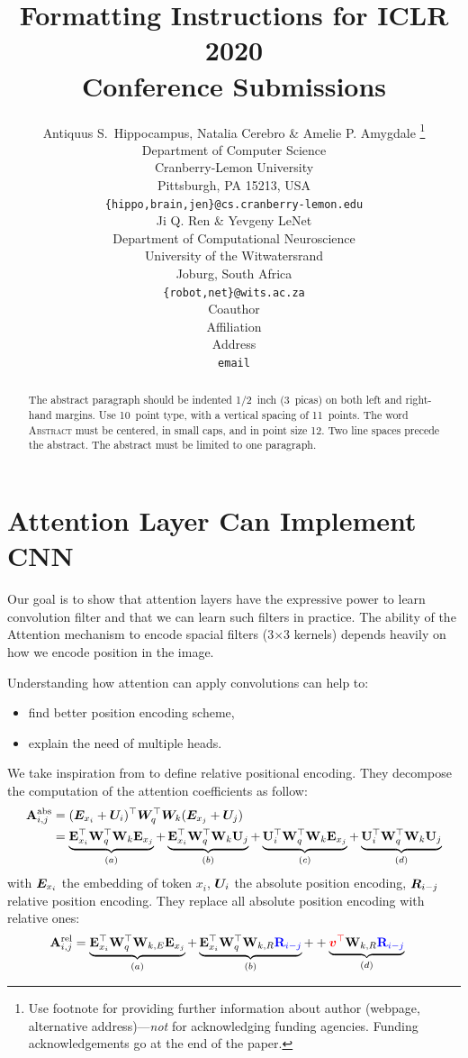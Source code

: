 \documentclass{article} %
\title{Formatting Instructions for ICLR 2020 \\ Conference Submissions}
\author{Antiquus S.~Hippocampus, Natalia Cerebro \& Amelie P. Amygdale \thanks{ Use footnote for providing further information
about author (webpage, alternative address)---\emph{not} for acknowledging
funding agencies.  Funding acknowledgements go at the end of the paper.} \\
Department of Computer Science\\
Cranberry-Lemon University\\
Pittsburgh, PA 15213, USA \\
\texttt{\{hippo,brain,jen\}@cs.cranberry-lemon.edu} \\
\And
Ji Q. Ren \& Yevgeny LeNet \\
Department of Computational Neuroscience \\
University of the Witwatersrand \\
Joburg, South Africa \\
\texttt{\{robot,net\}@wits.ac.za} \\
\AND
Coauthor \\
Affiliation \\
Address \\
\texttt{email}
}
\begin{document}
\maketitle

\begin{abstract}
The abstract paragraph should be indented 1/2~inch (3~picas) on both left and
right-hand margins. Use 10~point type, with a vertical spacing of 11~points.
The word \textsc{Abstract} must be centered, in small caps, and in point size 12. Two
line spaces precede the abstract. The abstract must be limited to one
paragraph.
\end{abstract}

\section{Attention Layer Can Implement CNN}

Our goal is to show that attention layers have the expressive power to learn 
convolution filter and that we can learn such filters in practice.
%
The ability of the Attention mechanism to encode spacial filters (3$\times$3 kernels) 
depends heavily on how we encode position in the image.


Understanding how attention can apply convolutions can help to:
\begin{itemize}
  \item find better position encoding scheme,
  \item explain the need of multiple heads.
\end{itemize}

We take inspiration from \citep[TransformerXL]{dai2019transformerxl} to define relative positional encoding.
They decompose the computation of the attention coefficients as follow:
\begin{align}
    \mathbf{A}_{i, j}^{\mathrm{abs}} &= ({\bm{E}}_{x_i} + {\bm{U}}_i)^\top {\bm{W}}_q^\top {\bm{W}}_k ({\bm{E}}_{x_j} + {\bm{U}}_j)\\
 &=
  \underbrace{\mathbf{E}_{x_{i}}^{\top} \mathbf{W}_{q}^{\top} \mathbf{W}_{k} \mathbf{E}_{x_{j}}}_{(a)} 
  +
  \underbrace{\mathbf{E}_{x_{i}}^{\top} \mathbf{W}_{q}^{\top} \mathbf{W}_{k} \mathbf{U}_{j}}_{(b)}
  +
  \underbrace{\mathbf{U}_{i}^{\top} \mathbf{W}_{q}^{\top} \mathbf{W}_{k} \mathbf{E}_{x_{j}}}_{(c)}
  +
  \underbrace{\mathbf{U}_{i}^{\top} \mathbf{W}_{q}^{\top} \mathbf{W}_{k} \mathbf{U}_{j}}_{(d)}
\end{align}
with ${\bm{E}}_{x_i}$ the embedding of token $x_i$, ${\bm{U}}_i$ the absolute position encoding, ${\bm{R}}_{i-j}$ relative position encoding. They replace all absolute position encoding with relative ones:
\begin{align}
  \mathbf{A}_{i, j}^{\mathrm{rel}} &=
  \underbrace{\mathbf{E}_{x_{i}}^{\top} \mathbf{W}_{q}^{\top} \mathbf{W}_{k, E} \mathbf{E}_{x_{j}}}_{(a)}
  +
  \underbrace{\mathbf{E}_{x_{i}}^{\top} \mathbf{W}_{q}^{\top} \mathbf{W}_{k, R} {\color{blue} \mathbf{R}_{i-j}}}_{(b)}
  +
  +
  \underbrace{{\color{red} {\bm{v}}^{\top}} \mathbf{W}_{k, R} {\color{blue} \mathbf{R}_{i-j}}}_{(d)}
  \label{eq:att_rel}
\end{align}
\end{document}
